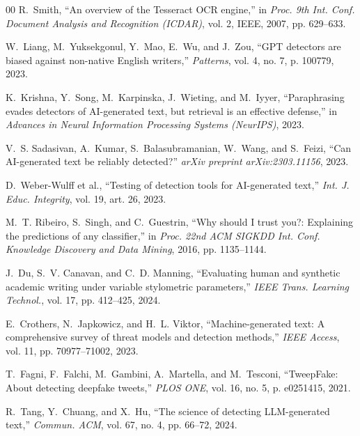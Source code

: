 \documentclass[conference]{IEEEtran}
\begin{document}
\begin{thebibliography}{00}
R.~Smith, ``An overview of the Tesseract OCR engine,'' in \textit{Proc. 9th Int. Conf. Document Analysis and Recognition (ICDAR)}, vol. 2, IEEE, 2007, pp. 629--633.

W.~Liang, M.~Yuksekgonul, Y.~Mao, E.~Wu, and J.~Zou, ``GPT detectors are biased against non-native English writers,'' \textit{Patterns}, vol. 4, no. 7, p. 100779, 2023.

K.~Krishna, Y.~Song, M.~Karpinska, J.~Wieting, and M.~Iyyer, ``Paraphrasing evades detectors of AI-generated text, but retrieval is an effective defense,'' in \textit{Advances in Neural Information Processing Systems (NeurIPS)}, 2023.

V.~S. Sadasivan, A.~Kumar, S.~Balasubramanian, W.~Wang, and S.~Feizi, ``Can AI-generated text be reliably detected?'' \textit{arXiv preprint arXiv:2303.11156}, 2023.

D.~Weber-Wulff et al., ``Testing of detection tools for AI-generated text,'' \textit{Int. J. Educ. Integrity}, vol. 19, art. 26, 2023.

M.~T. Ribeiro, S.~Singh, and C.~Guestrin, ``Why should I trust you?: Explaining the predictions of any classifier,'' in \textit{Proc. 22nd ACM SIGKDD Int. Conf. Knowledge Discovery and Data Mining}, 2016, pp. 1135--1144.

J.~Du, S.~V. Canavan, and C.~D. Manning, ``Evaluating human and synthetic academic writing under variable stylometric parameters,'' \textit{IEEE Trans. Learning Technol.}, vol. 17, pp. 412--425, 2024.

E.~Crothers, N.~Japkowicz, and H.~L. Viktor, ``Machine-generated text: A comprehensive survey of threat models and detection methods,'' \textit{IEEE Access}, vol. 11, pp. 70977--71002, 2023.

T.~Fagni, F.~Falchi, M.~Gambini, A.~Martella, and M.~Tesconi, ``TweepFake: About detecting deepfake tweets,'' \textit{PLOS ONE}, vol. 16, no. 5, p. e0251415, 2021.

R.~Tang, Y.~Chuang, and X.~Hu, ``The science of detecting LLM-generated text,'' \textit{Commun. ACM}, vol. 67, no. 4, pp. 66--72, 2024.

\end{thebibliography}
\end{document}
